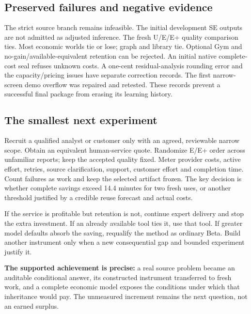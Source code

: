 \documentclass[10pt]{article}
\begin{document}
\subsection*{Preserved failures and negative evidence}

The strict source branch remains infeasible. The initial development SE outputs are not admitted as adjusted inference. The fresh U/E/E+ quality comparison ties. Most economic worlds tie or lose; graph and library tie. Optional Gym and no-gain/available-equivalent retention can be rejected. An initial native complete-cost seal refuses unknown costs. A one-cent residual-analysis rounding error and the capacity/pricing issues have separate correction records. The first narrow-screen demo overflow was repaired and retested. These records prevent a successful final package from erasing its learning history.

\subsection*{The smallest next experiment}

Recruit a qualified analyst or customer only with an agreed, reviewable narrow scope. Obtain an equivalent human-service quote. Randomize E/E+ order across unfamiliar reports; keep the accepted quality fixed. Meter provider costs, active effort, retries, source clarification, support, customer effort and completion time. Count failures as work and keep the selected artifact frozen. The key decision is whether complete savings exceed 14.4 minutes for two fresh uses, or another threshold justified by a credible reuse forecast and actual costs.

If the service is profitable but retention is not, continue expert delivery and stop the extra investment. If an already available tool ties it, use that tool. If greater model defaults absorb the saving, requalify the method as ordinary Beta. Build another instrument only when a new consequential gap and bounded experiment justify it.

\textbf{The supported achievement is precise:} a real source problem became an auditable conditional answer, its constructed instrument transferred to fresh work, and a complete economic model exposes the conditions under which that inheritance would pay. The unmeasured increment remains the next question, not an earned surplus.
\end{document}
